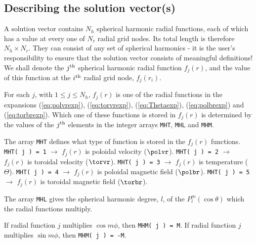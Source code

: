 \subsection{Describing the solution vector(s)}
\label{subsec:solvecdesc}

A solution vector contains $N_h$ spherical harmonic
radial functions, each of which has a value at every one
of $N_r$ radial grid nodes. Its total length is
therefore $N_h \times N_r$.
They can consist of any set of spherical
harmonics - it is the user's responsibility to ensure that
the solution vector consists of meaningful definitions!
We shall denote the $j^{\rm th}$ spherical harmonic
radial function $f_j( r )$, and the value of this
function at the $i^{\rm th}$ radial grid node,
$f_j( r_i )$.

For each $j$, with $1 \leq j \leq N_h$, $f_j( r )$ is one
of the radial functions in the expansions
(\ref{eq:polvrexp}),
(\ref{eq:torvrexp}), (\ref{eq:Thetaexp}),
(\ref{eq:polbrexp}) and (\ref{eq:torbrexp}).
Which one of these functions is stored in $f_j( r )$ is
determined by the values of the $j^{\rm th}$ elements
in the integer arrays \verb.MHT., \verb.MHL. and 
\verb.MHM..

The array \verb.MHT. defines what type of function
is stored in the $f_j( r )$ functions. \newline
\verb. . \newline
\verb+MHT( j ) = 1+ $\rightarrow$ $f_j(r)$ is poloidal velocity
 ($\polvr$). \newline
\verb+MHT( j ) = 2+ $\rightarrow$ $f_j(r)$ is toroidal velocity
 ($\torvr$). \newline
\verb+MHT( j ) = 3+ $\rightarrow$ $f_j(r)$ is temperature
 ($\Theta$). \newline
\verb+MHT( j ) = 4+ $\rightarrow$ $f_j(r)$ is poloidal
magnetic field ($\polbr$). \newline
\verb+MHT( j ) = 5+ $\rightarrow$ $f_j(r)$ is toroidal
magnetic field ($\torbr$). \newline

The array \verb.MHL. gives the spherical harmonic
degree, $l$, of the $P_l^m( \cos \theta )$ which the radial functions
multiply.

If radial function $j$ multiplies $\cos m \phi$, then
\verb+MHM( j ) = M+.
If radial function $j$ multiplies $\sin m \phi$, then
\verb+MHM( j ) = -M+.

